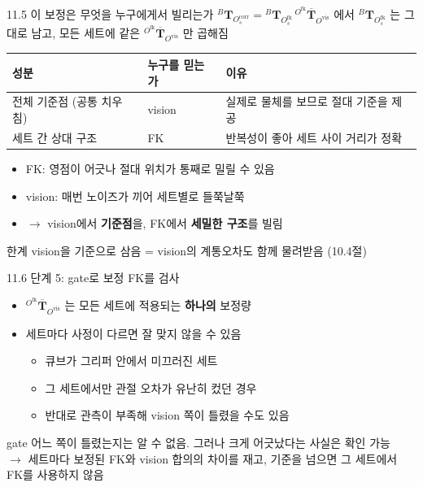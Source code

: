 \documentclass[aspectratio=169,11pt]{beamer}
\newcommand{\T}[3][]{{}^{#2}\mathbf{T}^{#1}_{#3}}   %
\newcommand{\Tb}[2]{{}^{#1}\overline{\mathbf{T}}_{#2}} %
\newcommand{\Ofk}{O^{\mathrm{fk}}}     %
\newcommand{\Ovis}{O^{\mathrm{vis}}}   %
\newcommand{\Ocorr}{O^{\mathrm{corr}}} %
\begin{document}
\begin{frame}{11.5 이 보정은 무엇을 누구에게서 빌리는가}
  $\T{B}{\Ocorr_s} = \T{B}{\Ofk_s}\,\Tb{\Ofk}{\Ovis}$
  에서 $\T{B}{\Ofk_s}$ 는 그대로 남고, 모든 세트에 같은 $\Tb{\Ofk}{\Ovis}$ 만 곱해짐
  \vfill
  \begin{center}
    \begin{tabular}{lll}
      \toprule
      성분 & 누구를 믿는가 & 이유 \\
      \midrule
      전체 기준점 (공통 치우침) & vision & 실제로 물체를 보므로 절대 기준을 제공 \\
      세트 간 상대 구조 & FK & 반복성이 좋아 세트 사이 거리가 정확 \\
      \bottomrule
    \end{tabular}
  \end{center}
  \vfill
  \begin{itemize}
    \item FK: 영점이 어긋나 절대 위치가 통째로 밀릴 수 있음
    \item vision: 매번 노이즈가 끼어 세트별로 들쭉날쭉
    \item $\rightarrow$ vision에서 \textbf{기준점}을, FK에서 \textbf{세밀한 구조}를 빌림
  \end{itemize}
  \vfill
  \begin{alertblock}{한계}
    vision을 기준으로 삼음 = vision의 계통오차도 함께 물려받음 (10.4절)
  \end{alertblock}
\end{frame}

\begin{frame}{11.6 단계 5: gate로 보정 FK를 검사}
  \begin{itemize}
    \item $\Tb{\Ofk}{\Ovis}$ 는 모든 세트에 적용되는 \textbf{하나의} 보정량
    \item 세트마다 사정이 다르면 잘 맞지 않을 수 있음
      \begin{itemize}
        \item 큐브가 그리퍼 안에서 미끄러진 세트
        \item 그 세트에서만 관절 오차가 유난히 컸던 경우
        \item 반대로 관측이 부족해 vision 쪽이 틀렸을 수도 있음
      \end{itemize}
  \end{itemize}
  \vfill
  \begin{alertblock}{gate}
    어느 쪽이 틀렸는지는 알 수 없음. 그러나 크게 어긋났다는 사실은 확인 가능\\
    $\rightarrow$ 세트마다 보정된 FK와 vision 합의의 차이를 재고,
    기준을 넘으면 그 세트에서 FK를 사용하지 않음
  \end{alertblock}
\end{frame}
\end{document}
